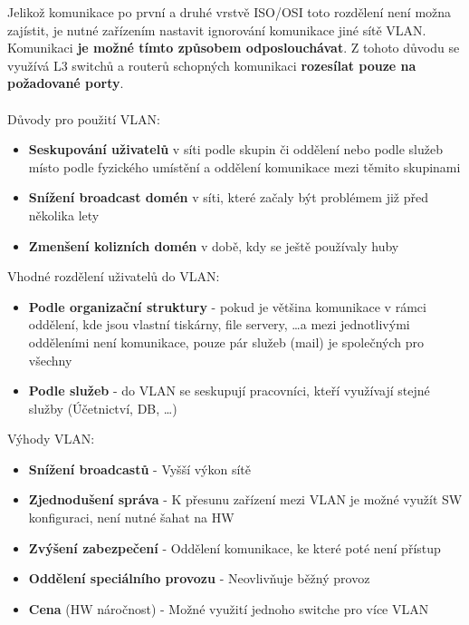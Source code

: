 Jelikož komunikace po první a druhé vrstvě ISO/OSI toto rozdělení není možna zajístit, je nutné zařízením nastavit ignorování komunikace jiné sítě VLAN.
Komunikaci \textbf{je možné tímto způsobem odposlouchávat}.
Z tohoto důvodu se využívá L3 switchů a routerů schopných komunikaci \textbf{rozesílat pouze na požadované porty}. \\
\\
Důvody pro použití VLAN:
\begin{itemize}
    \item \textbf{Seskupování uživatelů} v síti podle skupin či oddělení nebo podle služeb místo podle fyzického umístění a oddělení komunikace mezi těmito skupinami
    \item \textbf{Snížení broadcast domén} v síti, které začaly být problémem již před několika lety
    \item \textbf{Zmenšení kolizních domén} v době, kdy se ještě používaly huby
\end{itemize}
Vhodné rozdělení uživatelů do VLAN:
\begin{itemize}
    \item \textbf{Podle organizační struktury} - pokud je většina komunikace v rámci oddělení, kde jsou vlastní tiskárny, file servery, \dots a mezi jednotlivými odděleními není komunikace, pouze pár služeb (mail) je společných pro všechny
    \item \textbf{Podle služeb} - do VLAN se seskupují pracovníci, kteří využívají stejné služby (Účetnictví, DB, \dots)
\end{itemize}
Výhody VLAN:
\begin{itemize}
    \item \textbf{Snížení broadcastů} - Vyšší výkon sítě
    \item \textbf{Zjednodušení správa} - K přesunu zařízení mezi VLAN je možné využít SW konfiguraci, není nutné šahat na HW
    \item \textbf{Zvýšení zabezpečení} - Oddělení komunikace, ke které poté není přístup
    \item \textbf{Oddělení speciálního provozu} - Neovlivňuje běžný provoz
    \item \textbf{Cena} (HW náročnost) - Možné využití jednoho switche pro více VLAN
\end{itemize}

